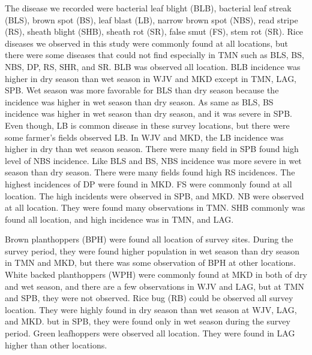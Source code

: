 The disease we recorded were bacterial leaf blight (BLB), bacterial leaf streak (BLS), brown spot (BS), leaf blast (LB), narrow brown spot (NBS), read stripe (RS), sheath blight (SHB), sheath rot (SR), false smut (FS), stem rot (SR). Rice diseases we observed in this study were commonly found at all locations, but there were some diseases that could not find especially in TMN such as BLS, BS, NBS, DP, RS, SHR, and SR. BLB was observed all location. BLB incidence was higher in dry season than wet season in WJV and MKD except in TMN, LAG, SPB. Wet season was more favorable for BLS than dry season because the incidence was higher in wet season than dry season. As same as BLS, BS incidence was higher in wet season than dry season, and it was severe in SPB. Even though, LB is common disease in these survey locations, but there were some farmer’s fields observed LB. In WJV and MKD, the LB incidence was higher in dry than wet season season. There were many field in SPB found high level of NBS incidence. Like BLS and BS, NBS incidence was more severe in wet season than dry season. There were many fields found high RS incidences. The highest incidences of DP were found in MKD. FS were commonly found at all location. The high incidents were observed in SPB, and MKD. NB were observed at all location. They were found many observations in TMN.  SHB commonly was found all location, and high incidence was in TMN, and LAG. 

Brown planthoppers (BPH) were found all location of survey sites. During the survey period, they were found higher population in wet season than dry season in TMN and MKD, but there was some observation of BPH at other locations. White backed planthoppers (WPH) were commonly found at MKD in both of dry and wet season, and there are a few observations in WJV and LAG, but at TMN and SPB, they were not observed. Rice bug (RB) could be observed all survey location. They were highly found in dry season than wet season at WJV, LAG, and MKD. but in SPB, they were found only in wet season during the survey period.  Green leafhoppers were observed all location. They were found in LAG higher than other locations.




